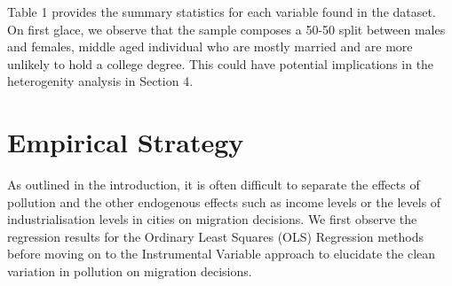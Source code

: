 \documentclass[11pt,twocolumn]{article}
\begin{document}
Table 1 provides the summary statistics for each variable found in the dataset. On first glace, we observe that the sample composes a 50-50 split between males and females, middle aged individual who are mostly married and are more unlikely to hold a college degree. This could have potential implications in the heterogenity analysis in Section 4. 

\section{Empirical Strategy}
As outlined in the introduction, it is often difficult to separate the effects of pollution and the other endogenous effects such as income levels or the levels of industrialisation levels in cities on migration decisions. We first observe the regression results for the Ordinary Least Squares (OLS) Regression methods before moving on to the Instrumental Variable approach to elucidate the clean variation in pollution on migration decisions. 
\end{document}
